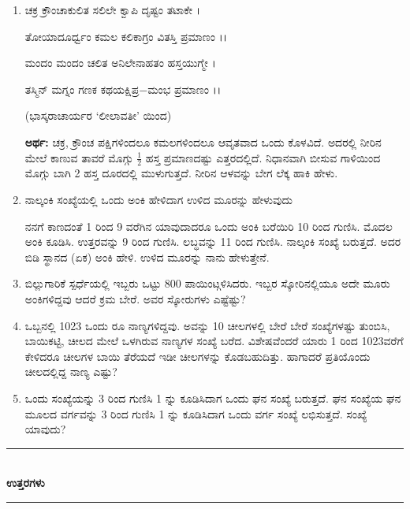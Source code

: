 \begin{enumerate}
\item ಚಕ್ರ ಕ್ರೌಂಚಾಕುಲಿತ ಸಲಿಲೇ ಕ್ವಾಪಿ ದೃಷ್ಟಂ ತಟಾಕೇ । 

ತೋಯಾದೂರ್ಧ್ವಂ ಕಮಲ ಕಲಿಕಾಗ್ರಂ ವಿತಸ್ತಿ ಪ್ರಮಾಣಂ ।।

ಮಂದಂ ಮಂದಂ ಚಲಿತ ಅನಿಲೇನಾಹತಂ ಹಸ್ತಯುಗ್ಮೇ ।

ತಸ್ಮಿನ್ ಮಗ್ನಂ ಗಣಕ ಕಥಯಕ್ಷಿಪ್ರ$-$ಮಂಭ ಪ್ರಮಾಣಂ ।।

\smallskip
\hfill (ಭಾಸ್ಕರಾಚಾರ್ಯರ `ಲೀಲಾವತೀ' ಯಿಂದ)

\smallskip
{\bf ಅರ್ಥ:} ಚಕ್ರ, ಕ್ರೌಂಚ ಪಕ್ಷಿಗಳಿಂದಲೂ ಕಮಲಗಳಿಂದಲೂ ಆವೃತವಾದ ಒಂದು ಕೊಳವಿದೆ. ಅದರಲ್ಲಿ ನೀರಿನ ಮೇಲೆ ಕಾಣುವ ತಾವರೆ ಮೊಗ್ಗು $\frac{1}{2}$ ಹಸ್ತ ಪ್ರಮಾಣದಷ್ಟು ಎತ್ತರದಲ್ಲಿದೆ. ನಿಧಾನವಾಗಿ ಬೀಸುವ ಗಾಳಿಯಿಂದ ಮೊಗ್ಗು ಬಾಗಿ 2 ಹಸ್ತ ದೂರದಲ್ಲಿ ಮುಳುಗುತ್ತದೆ. ನೀರಿನ ಆಳವನ್ನು ಬೇಗ ಲೆಕ್ಕ ಹಾಕಿ ಹೇಳು. 

\item ನಾಲ್ಕಂಕಿ ಸಂಖ್ಯೆಯಲ್ಲಿ ಒಂದು ಅಂಕಿ ಹೇಳಿದಾಗ ಉಳಿದ ಮೂರನ್ನು ಹೇಳುವುದು 

ನನಗೆ ಕಾಣದಂತೆ 1 ರಿಂದ 9 ವರೆಗಿನ ಯಾವುದಾದರೂ ಒಂದು ಅಂಕಿ ಬರೆಯಿರಿ 10 ರಿಂದ ಗುಣಿಸಿ. ಮೊದಲ ಅಂಕಿ ಕೂಡಿಸಿ. ಉತ್ತರವನ್ನು 9 ರಿಂದ ಗುಣಿಸಿ. ಲಬ್ಧವನ್ನು 11 ರಿಂದ ಗುಣಿಸಿ. ನಾಲ್ಕಂಕಿ ಸಂಖ್ಯೆ ಬರುತ್ತದೆ. ಅದರ ಬಿಡಿ ಸ್ಥಾನದ (ಏಕ) ಅಂಕಿ ಹೇಳಿ. ಉಳಿದ ಮೂರನ್ನು ನಾನು ಹೇಳುತ್ತೇನೆ.

\item ಬಿಲ್ಲುಗಾರಿಕೆ ಸ್ಪರ್ಧೆಯಲ್ಲಿ ಇಬ್ಬರು ಒಟ್ಟು 800 ಪಾಯಿಂಟ್ಗಳಿಸಿದರು. ಇಬ್ಬರ ಸ್ಕೋರಿನಲ್ಲಿಯೂ ಅದೇ ಮೂರು ಅಂಕಿಗಳಿದ್ದವು ಆದರೆ ಕ್ರಮ ಬೇರೆ. ಅವರ ಸ್ಕೋರುಗಳು ಎಷ್ಟೆಷ್ಟು? 

\item ಒಬ್ಬನಲ್ಲಿ 1023 ಒಂದು ರೂ ನಾಣ್ಯಗಳಿದ್ದವು. ಅವನ್ನು 10 ಚೀಲಗಳಲ್ಲಿ ಬೇರೆ ಬೇರೆ ಸಂಖ್ಯೆಗಳಷ್ಟು ತುಂಬಿಸಿ, ಬಾಯಿಕಟ್ಟಿ, ಚೀಲದ ಮೇಲೆ ಒಳಗಿರುವ ನಾಣ್ಯಗಳ ಸಂಖ್ಯೆ ಬರೆದ. ವಿಶೇಷವೆಂದರೆ ಯಾರು 1 ರಿಂದ 1023ವರೆಗೆ ಕೇಳಿದರೂ ಚೀಲಗಳ ಬಾಯಿ ತೆರೆಯದೆ ಇಡೀ ಚೀಲಗಳನ್ನು ಕೊಡಬಹುದಿತ್ತು. ಹಾಗಾದರೆ ಪ್ರತಿಯೊಂದು ಚೀಲದಲ್ಲಿದ್ದ ನಾಣ್ಯ ಎಷ್ಟು? 

\item ಒಂದು ಸಂಖ್ಯೆಯನ್ನು 3 ರಿಂದ ಗುಣಿಸಿ 1 ನ್ನು ಕೂಡಿಸಿದಾಗ ಒಂದು ಘನ ಸಂಖ್ಯೆ ಬರುತ್ತದೆ. ಘನ ಸಂಖ್ಯೆಯ ಘನ ಮೂಲದ ವರ್ಗವನ್ನು 3 ರಿಂದ ಗುಣಿಸಿ 1 ನ್ನು ಕೂಡಿಸಿದಾಗ ಒಂದು ವರ್ಗ ಸಂಖ್ಯೆ ಲಭಿಸುತ್ತದೆ. ಸಂಖ್ಯೆ ಯಾವುದು?
\end{enumerate}



\begin{center}
\rule{5cm}{1pt}\\[3pt]
{\Large\bfseries ಉತ್ತರಗಳು}\\[-0.1cm]
\rule{5cm}{1pt}
\end{center}



